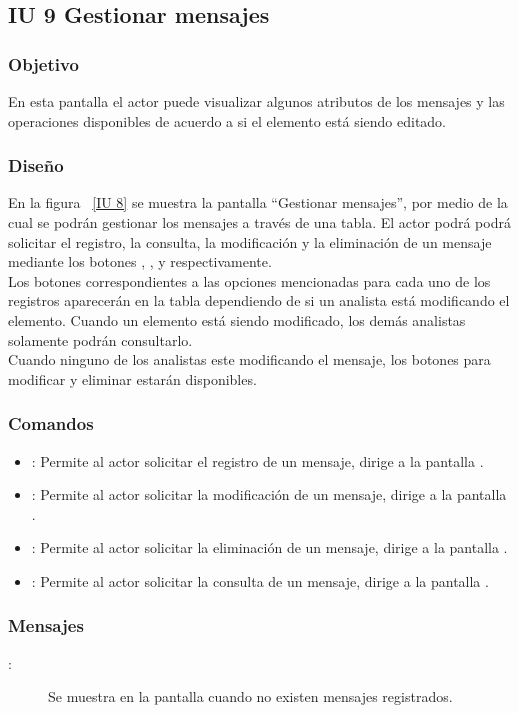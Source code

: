 \newpage 
\subsection{IU 9 Gestionar mensajes}
\subsubsection{Objetivo}
	
	En esta pantalla el actor puede visualizar algunos atributos de los mensajes y las operaciones disponibles de acuerdo a si el elemento está siendo editado.

\subsubsection{Diseño}

    En la figura ~\ref{IU 8} se muestra la pantalla ``Gestionar mensajes'', por medio de la cual 
    se podrán gestionar los mensajes a través de una tabla.
    El actor podrá podrá solicitar el registro, la consulta, la modificación y la eliminación de un mensaje mediante los botones
    , \btnConsulta, \btnEditar y \btnEliminar respectivamente. \\
    
    Los botones correspondientes a las opciones mencionadas para cada uno de los registros aparecerán en la tabla dependiendo de si 
    un analista está modificando el elemento. Cuando un elemento está siendo modificado, los demás analistas solamente podrán consultarlo.\\
   
    Cuando ninguno de los analistas este modificando el mensaje, los botones para modificar y eliminar estarán disponibles.
    


\subsubsection{Comandos}
\begin{itemize}
	\item {}: Permite al actor solicitar el registro de un mensaje, dirige a la pantalla .
	\item \btnEditar[Modificar]: Permite al actor solicitar la modificación de un mensaje, dirige a la pantalla .
	\item \btnEliminar[Eliminar]: Permite al actor solicitar la eliminación de un mensaje, dirige a la pantalla .
	\item \btnConsulta[Consultar]: Permite al actor solicitar la consulta de un mensaje, dirige a la pantalla .
\end{itemize}

\subsubsection{Mensajes}

	
\begin{description}
	\item[:] Se muestra en la pantalla  cuando no existen mensajes registrados.
\end{description}

